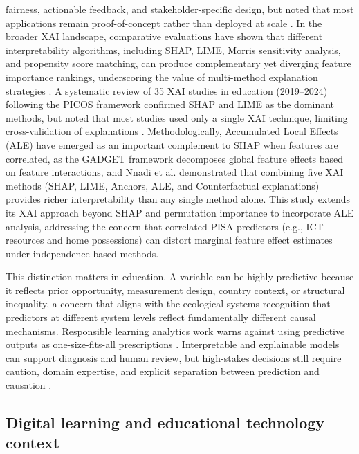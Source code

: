 \documentclass[pdflatex,sn-mathphys-ay]{sn-jnl}
\begin{document}
fairness, actionable feedback, and stakeholder-specific design, but noted that most applications remain proof-of-concept rather than deployed at scale \citep{WIREs_2025_counterfactual}. In the broader XAI landscape, comparative evaluations have shown that different interpretability algorithms, including SHAP, LIME, Morris sensitivity analysis, and propensity score matching, can produce complementary yet diverging feature importance rankings, underscoring the value of multi-method explanation strategies \citep{Niu_2025}. A systematic review of 35 XAI studies in education (2019--2024) following the PICOS framework confirmed SHAP and LIME as the dominant methods, but noted that most studies used only a single XAI technique, limiting cross-validation of explanations \citep{Turkmen_2024_xai_review}. Methodologically, Accumulated Local Effects (ALE) have emerged as an important complement to SHAP when features are correlated, as the GADGET framework \citep{Herbinger_2024_GADGET} decomposes global feature effects based on feature interactions, and Nnadi et al. \citep{Nnadi_2024_adaptability} demonstrated that combining five XAI methods (SHAP, LIME, Anchors, ALE, and Counterfactual explanations) provides richer interpretability than any single method alone. This study extends its XAI approach beyond SHAP and permutation importance to incorporate ALE analysis, addressing the concern that correlated PISA predictors (e.g., ICT resources and home possessions) can distort marginal feature effect estimates under independence-based methods.

This distinction matters in education. A variable can be highly predictive because it reflects prior opportunity, measurement design, country context, or structural inequality, a concern that aligns with the ecological systems recognition that predictors at different system levels reflect fundamentally different causal mechanisms. Responsible learning analytics work warns against using predictive outputs as one-size-fits-all prescriptions \citep{Joksimovic_2020}. Interpretable and explainable models can support diagnosis and human review, but high-stakes decisions still require caution, domain expertise, and explicit separation between prediction and causation \citep{Rudin_2019,Susnjak_2022}.

\subsection{Digital learning and educational technology context}
\end{document}
